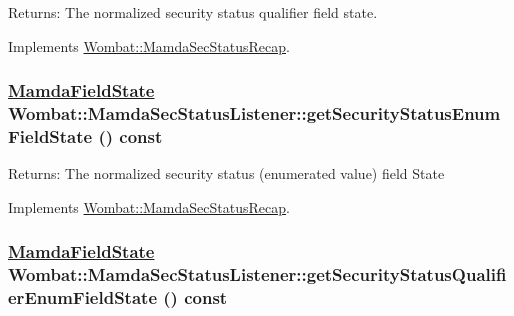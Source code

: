 \begin{Desc}
\item[Returns:]The normalized security status qualifier field state. \end{Desc}


Implements \hyperlink{classWombat_1_1MamdaSecStatusRecap_65f3b09b216df6fbe543f00934b8f93e}{Wombat::Mamda\-Sec\-Status\-Recap}.\hypertarget{classWombat_1_1MamdaSecStatusListener_835f73068705630588709dcdaae9ccda}{
\subsubsection[getSecurityStatusEnumFieldState]{\setlength{\rightskip}{0pt plus 5cm}\hyperlink{namespaceWombat_93aac974f2ab713554fd12a1fa3b7d2a}{Mamda\-Field\-State} Wombat::Mamda\-Sec\-Status\-Listener::get\-Security\-Status\-Enum\-Field\-State () const}}
\label{classWombat_1_1MamdaSecStatusListener_835f73068705630588709dcdaae9ccda}


\begin{Desc}
\item[Returns:]The normalized security status (enumerated value) field State \end{Desc}


Implements \hyperlink{classWombat_1_1MamdaSecStatusRecap_abd7b41fb4189d19dc1a064d78c58d3f}{Wombat::Mamda\-Sec\-Status\-Recap}.\hypertarget{classWombat_1_1MamdaSecStatusListener_e3202a65672a14d3d890a4318f391856}{
\subsubsection[getSecurityStatusQualifierEnumFieldState]{\setlength{\rightskip}{0pt plus 5cm}\hyperlink{namespaceWombat_93aac974f2ab713554fd12a1fa3b7d2a}{Mamda\-Field\-State} Wombat::Mamda\-Sec\-Status\-Listener::get\-Security\-Status\-Qualifier\-Enum\-Field\-State () const}}
\label{classWombat_1_1MamdaSecStatusListener_e3202a65672a14d3d890a4318f391856}


